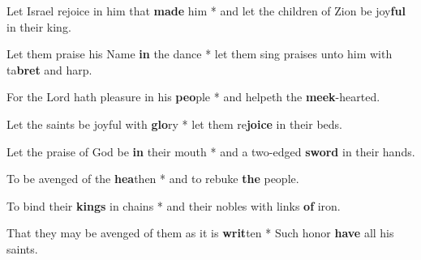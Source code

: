 \begin{multicols}{2}
	Let Israel rejoice in him that \textbf{made} him * and let the children of Zion be joy\textbf{ful} in their king.
	
	Let them praise his Name \textbf{in} the dance * let them sing praises unto him with ta\textbf{bret} and harp.
	
	For the Lord hath pleasure in his \textbf{peo}ple * and helpeth the \textbf{meek}-hearted.
	
	Let the saints be joyful with \textbf{glo}ry * let them re\textbf{joice} in their beds.
	
	Let the praise of God be \textbf{in} their mouth * and a two-edged \textbf{sword} in their hands.
	
	To be avenged of the \textbf{hea}then * and to rebuke \textbf{the} people.
	
	To bind their \textbf{kings} in chains * and their nobles with links \textbf{of} iron.
	
	That they may be avenged of them as it is \textbf{writ}ten * Such honor \textbf{have} all his saints.
\end{multicols}